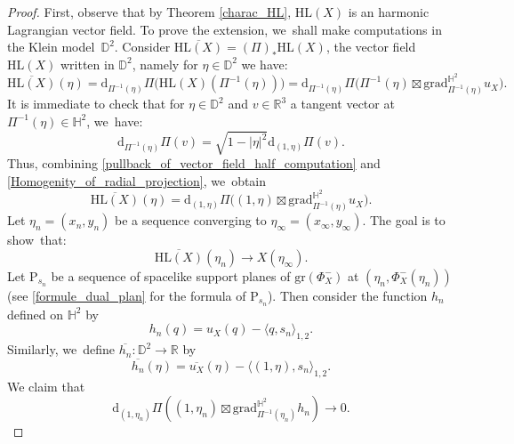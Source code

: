 \documentclass[10pt]{amsart}
\theoremstyle{plain}
\theoremstyle{definition}
\newcommand{\grad}{\mathrm{grad}^{\mathbb{H}^2}}
\newcommand{\inner}[1] {\langle #1 \rangle}
\begin{document}
\begin{proof}
First, observe that by Theorem \ref{charac_HL}, $\mathrm{HL}(X)$ is an harmonic Lagrangian vector field. To prove the extension, we~shall make computations in the Klein model~$\mathbb{D}^2$. Consider $\overline{\mathrm{HL}(X)}=(\Pi)_*\mathrm{HL}(X)$, the vector field $\mathrm{HL}(X)$ written in $\mathbb{D}^2$, namely for $\eta\in\mathbb{D}^2$ we have:
\begin{equation}\label{pullback_of_vector_field_half_computation}
\overline{\mathrm{HL}(X)}(\eta)=\mathrm{d}_{\Pi^{-1}(\eta)}\Pi\bigl(\mathrm{HL}(X)(\Pi^{-1}(\eta)) \bigr)=\mathrm{d}_{\Pi^{-1}(\eta)}\Pi\bigl(\Pi^{-1}(\eta)\boxtimes\grad_{\Pi^{-1}(\eta)} u_X \bigr).
\end{equation}
It is immediate to check that for $\eta\in \mathbb{D}^2$ and $v\in \mathbb{R}^3$ a tangent vector at $\Pi^{-1}(\eta)\in \mathbb{H}^2$, we~have:
\begin{equation}\label{Homogenity_of_radial_projection}
\mathrm{d}_{\Pi^{-1}(\eta)}\Pi(v)=\sqrt{1-\lvert\eta\rvert^2}\mathrm{d}_{(1,\eta)}\Pi(v).
\end{equation}
Thus, combining \eqref{pullback_of_vector_field_half_computation} and \eqref{Homogenity_of_radial_projection}, we~obtain
\begin{equation}\label{pullback_of_vector_field}
\overline{\mathrm{HL}(X)}(\eta)=\mathrm{d}_{(1,\eta)}\Pi\bigl((1,\eta)\boxtimes\grad_{\Pi^{-1}(\eta)} u_X \bigr).
\end{equation}
Let $\eta_n\!=\!(x_n,y_n)$ be a sequence converging to $\eta_{\infty}\!=\!(x_{\infty},y_{\infty})$. The goal is to show~that:
\begin{equation}\label{goal}
\overline{\mathrm{HL}(X)}(\eta_n)\to X(\eta_{\infty}).
\end{equation}
Let $\mathrm{P}_{s_n}$ be a sequence of spacelike support planes of $\mathrm{gr}(\Phi_X^-)$ at $(\eta_n,\Phi_X^-(\eta_n))$ (see \eqref{formule_dual_plan} for the formula of $\mathrm{P}_{s_n}$). Then consider the function $h_n$ defined on $\mathbb{H}^2$ by
\[
h_n(q)=u_X(q)-\inner{q,s_n}_{1,2}.
\]
Similarly, we~define $\overline{h_n}:\mathbb{D}^2\to\mathbb{R}$ by \begin{equation}\label{eq_h_n_positive}
\overline{h_n}(\eta)=\overline{u_X}(\eta)-\inner{(1,\eta),s_n}_{1,2}.
\end{equation} We claim that
\begin{equation}\label{claiminextension}
\mathrm{d}_{(1,\eta_n)}\Pi\left((1,\eta_n)\boxtimes\grad_{\Pi^{-1}(\eta_n)} h_n \right)\to 0.
\end{equation}

\end{proof}
\end{document}
